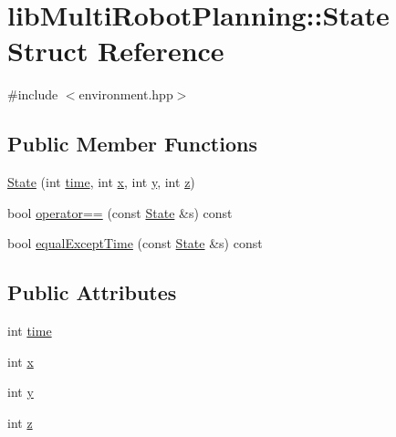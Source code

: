 \hypertarget{structlib_multi_robot_planning_1_1_state}{}\section{lib\+Multi\+Robot\+Planning\+:\+:State Struct Reference}
\label{structlib_multi_robot_planning_1_1_state}


{\ttfamily \#include $<$environment.\+hpp$>$}

\subsection*{Public Member Functions}
\begin{DoxyCompactItemize}
\item 
\hyperlink{structlib_multi_robot_planning_1_1_state_af7aabb0901e59446d9067f2747a85fc2}{State} (int \hyperlink{structlib_multi_robot_planning_1_1_state_aa17a0558cc7338969be67626bd17082a}{time}, int \hyperlink{structlib_multi_robot_planning_1_1_state_a33c79339cb6a22c402518cfb4414959f}{x}, int \hyperlink{structlib_multi_robot_planning_1_1_state_ad23e634dc9b9dbd7c1021c67aa0cce9c}{y}, int \hyperlink{structlib_multi_robot_planning_1_1_state_af73c034e22c1f2e6851a12c4c51c9199}{z})
\item 
bool \hyperlink{structlib_multi_robot_planning_1_1_state_ac4e1772061abe4e9e5eda48d0ffb3133}{operator==} (const \hyperlink{structlib_multi_robot_planning_1_1_state}{State} \&s) const
\item 
bool \hyperlink{structlib_multi_robot_planning_1_1_state_a1067b5c669fb82dce96b4f07476ea655}{equal\+Except\+Time} (const \hyperlink{structlib_multi_robot_planning_1_1_state}{State} \&s) const
\end{DoxyCompactItemize}
\subsection*{Public Attributes}
\begin{DoxyCompactItemize}
\item 
int \hyperlink{structlib_multi_robot_planning_1_1_state_aa17a0558cc7338969be67626bd17082a}{time}
\item 
int \hyperlink{structlib_multi_robot_planning_1_1_state_a33c79339cb6a22c402518cfb4414959f}{x}
\item 
int \hyperlink{structlib_multi_robot_planning_1_1_state_ad23e634dc9b9dbd7c1021c67aa0cce9c}{y}
\item 
int \hyperlink{structlib_multi_robot_planning_1_1_state_af73c034e22c1f2e6851a12c4c51c9199}{z}
\end{DoxyCompactItemize}
